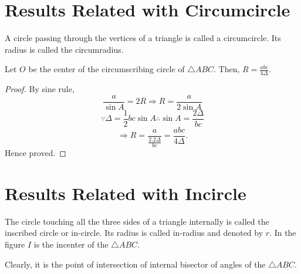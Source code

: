 \section{Results Related with Circumcircle}
A circle passing through the vertices of a triangle is called a circumcircle. Its radius is called the circumradius.
\begin{theorem}
  Let $O$ be the center of the circumscribing circle of $\triangle ABC$. Then, $R = \frac{abc}{4\Delta}$.
  \begin{center}
  \end{center}
\end{theorem}

\begin{proof}
  By sine rule, $$\frac{a}{\sin A} = 2R \Rightarrow R = \frac{a}{2\sin A}$$
  $$\because \Delta = \frac{1}{2}bc\sin A \therefore \sin A = \frac{2\Delta}{bc}$$
  $$\Rightarrow R = \frac{a}{\frac{2.2\Delta}{bc}} = \frac{abc}{4\Delta}.$$
  Hence proved.
\end{proof}

\section{Results Related with Incircle}
The circle touching all the three sides of a triangle internally is called the inscribed circle or in-circle. Its radius is called
in-radius and denoted by $r$. In the figure $I$ is the incenter of the $\triangle ABC$.

Clearly, it is the point of intersection of internal bisector of angles of the $\triangle ABC$.

